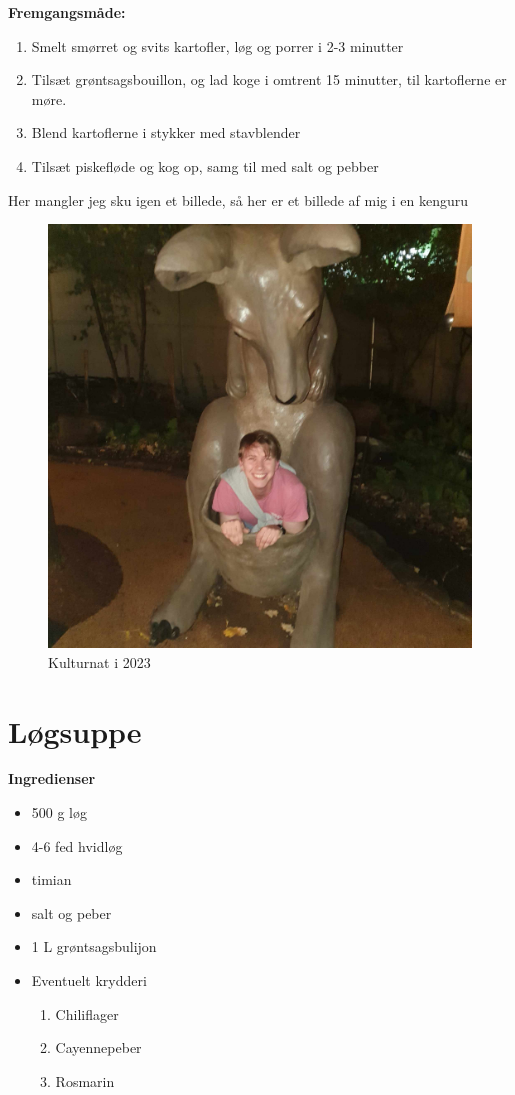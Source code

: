 \documentclass{book}
\begin{document}
\begin{minipage}[t]{0.5\textwidth}
\textbf{Fremgangsmåde:}
\begin{enumerate}
    \item Smelt smørret og svits kartofler, løg og porrer i 2-3 minutter
    \item Tilsæt grøntsagsbouillon, og lad koge i omtrent 15 minutter, til kartoflerne er møre.
    \item Blend kartoflerne i stykker med stavblender
    \item Tilsæt piskefløde og kog op, samg til med salt og pebber
\end{enumerate}
\end{minipage}
\newpage Her mangler jeg sku igen et billede, så her er et billede af mig i en kenguru 
\begin{figure}
    \centering
    \includegraphics[width=0.5\linewidth]{Kenguru.jpeg}
    \caption{Kulturnat i 2023}
    
\end{figure}
\newpage \section{Løgsuppe}
\begin{minipage}[t]{0.5\textwidth}
\textbf{Ingredienser}
\begin{itemize}
    \item 500 g løg 
    \item 4-6 fed hvidløg
    \item timian
    \item salt og peber
    \item 1 L grøntsagsbulijon 
    \item Eventuelt krydderi
    \begin{enumerate}
        \item Chiliflager
        \item Cayennepeber
        \item Rosmarin
    \end{enumerate}
\end{itemize}
\end{minipage}
\end{document}
